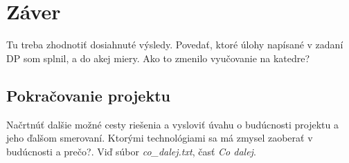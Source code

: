 \chapter{Záver}

Tu treba zhodnotiť dosiahnuté výsledy. Povedať, ktoré úlohy napísané v zadaní DP som splnil, a do akej miery. Ako to zmenilo vyučovanie na katedre?

\section{Pokračovanie projektu}

Načrtnúť dalšie možné cesty riešenia a vysloviť úvahu o budúcnosti projektu a jeho ďalšom smerovaní. Ktorými technológiami sa má zmysel zaoberať v budúcnosti a prečo?. Viď súbor \emph{co\_dalej.txt}, časť \emph{Co dalej}.